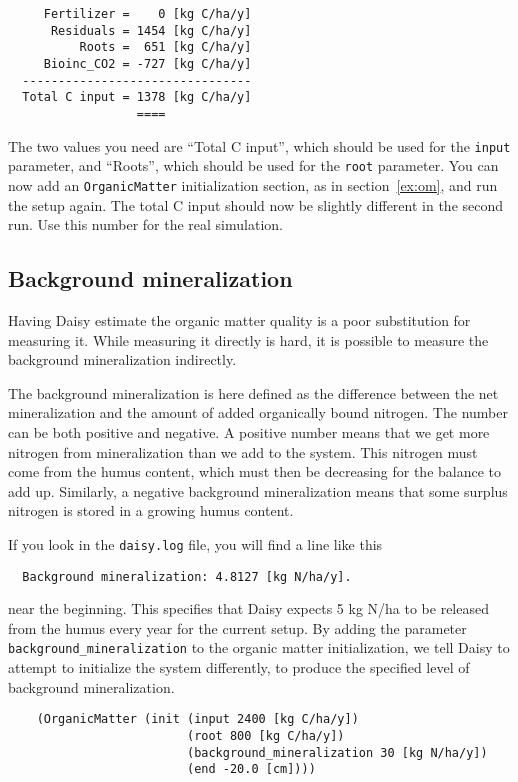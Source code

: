 \documentclass[a4paper]{article}
\begin{document}
\begin{verbatim}
     Fertilizer =    0 [kg C/ha/y]
      Residuals = 1454 [kg C/ha/y]
          Roots =  651 [kg C/ha/y]
     Bioinc_CO2 = -727 [kg C/ha/y]
  --------------------------------
  Total C input = 1378 [kg C/ha/y]
                  ====
\end{verbatim}

The two values you need are ``Total C input'', which should be used
for the \texttt{input} parameter, and ``Roots'', which should be used
for the \texttt{root} parameter.  You can now add an
\texttt{OrganicMatter} initialization section, as in
section~\ref{ex:om}, and run the setup again.  The total C input
should now be slightly different in the second run.  Use this number
for the real simulation.

\subsection{Background mineralization}
\label{sec:background}

Having Daisy estimate the organic matter quality is a poor
substitution for measuring it.  While measuring it directly is hard,
it is possible to measure the background mineralization indirectly. 

The background mineralization is here defined as the difference
between the net mineralization and the amount of added organically
bound nitrogen.  The number can be both positive and negative.  A
positive number means that we get more nitrogen from mineralization
than we add to the system.  This nitrogen must come from the humus
content, which must then be decreasing for the balance to add up.
Similarly, a negative background mineralization means that some
surplus nitrogen is stored in a growing humus content.

If you look in the \texttt{daisy.log} file, you will find a line like
this
\begin{verbatim}
  Background mineralization: 4.8127 [kg N/ha/y].
\end{verbatim}
near the beginning.  This specifies that Daisy expects 5 kg N/ha to
be released from the humus every year for the current setup.  By
adding the parameter \texttt{background\_mineralization} to the
organic matter initialization, we tell Daisy to attempt to
initialize the system differently, to produce the specified level of
background mineralization.

\begin{verbatim}
    (OrganicMatter (init (input 2400 [kg C/ha/y])
                         (root 800 [kg C/ha/y])
                         (background_mineralization 30 [kg N/ha/y]) 
                         (end -20.0 [cm])))
\end{verbatim}
\end{document}
